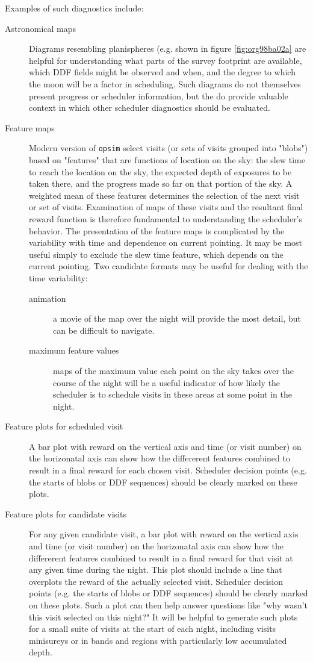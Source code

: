 Examples of such diagnostics include:
\begin{description}
\item[{Astronomical maps}] Diagrams resembling planispheres (e.g. shown in figure \ref{fig:org98ba02a} are helpful for understanding what parts of the survey footprint are available, which DDF fields might be observed and when, and the degree to which the moon will be a factor in scheduling. Such diagrams do not themselves present progress or scheduler information, but the do provide valuable context in which other scheduler diagnostics should be evaluated.
\item[{Feature maps}] Modern version of \texttt{opsim} select visits (or sets of visits grouped into "blobs") based on "features" that are functions of location on the sky: the slew time to reach the location on the sky, the expected depth of exposures to be taken there, and the progress made so far on that portion of the sky. A weighted mean of these features determines the selection of the next visit or set of visits. Examination of maps of these visits and the resultant final reward function is therefore fundamental to understanding the scheduler's behavior. The presentation of the feature maps is complicated by the variability with time and dependence on current pointing. It may be most useful simply to exclude the slew time feature, which depends on the current pointing. Two candidate formats may be useful for dealing with the time variability:
\begin{description}
\item[{animation}] a movie of the map over the night will provide the most detail, but can be difficult to navigate.
\item[{maximum feature values}] maps of the maximum value each point on the sky takes over the course of the night will be a useful indicator of how likely the scheduler is to schedule visits in these areas at some point in the night.
\end{description}
\item[{Feature plots for scheduled visit}] A bar plot with reward on the vertical axis and time (or visit number) on the horizonatal axis can show how the differerent features combined to result in a final reward for each chosen visit. Scheduler decision points (e.g. the starts of blobs or DDF sequences) should be clearly marked on these plots.
\item[{Feature plots for candidate visits}] For any given candidate visit, a bar plot with reward on the vertical axis and time (or visit number) on the horizonatal axis can show how the differerent features combined to result in a final reward for that visit at any given time during the night. This plot should include a line that overplots the reward of the actually selected visit.  Scheduler decision points (e.g. the starts of blobs or DDF sequences) should be clearly marked on these plots. Such a plot can then help answer questions like "why wasn't this visit selected on this night?" It will be helpful to generate such plots for a small suite of visits at the start of each night, including visits minisureys or in bands and regions with particularly low accumulated depth.

\end{description}
